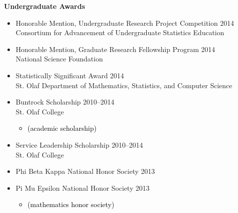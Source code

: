 \documentclass[margin]{res}
\newcommand{\annotateItem}[1]{
	\begin{itemize} \vspace{-0.1cm}
	\item[] 
	\begin{footnotesize}\textcolor{black}{(#1)}\end{footnotesize}
	\end{itemize} \vspace{-0.1cm}
}
\begin{document}
\begin{resume}
\textbf{Undergraduate Awards}
\begin{itemize}

\item Honorable Mention, Undergraduate Research Project Competition \hfill 2014  \\
Consortium for Advancement of Undergraduate Statistics Education

\item Honorable Mention, Graduate Research Fellowship Program  \hfill 2014 \\
National Science Foundation

\item Statistically Significant Award \hfill 2014 \\
St. Olaf Department of Mathematics, Statistics, and Computer Science 

\item Buntrock Scholarship \hfill 2010--2014 \\
St. Olaf College 
	\annotateItem{academic scholarship}

\item Service Leadership Scholarship \hfill 2010--2014 \\
St. Olaf College 

\item Phi Beta Kappa National Honor Society \hfill 2013 

\item Pi Mu Epsilon National Honor Society \hfill 2013 %
  \annotateItem{mathematics honor society}


\end{itemize}








\end{resume}
\end{document}
